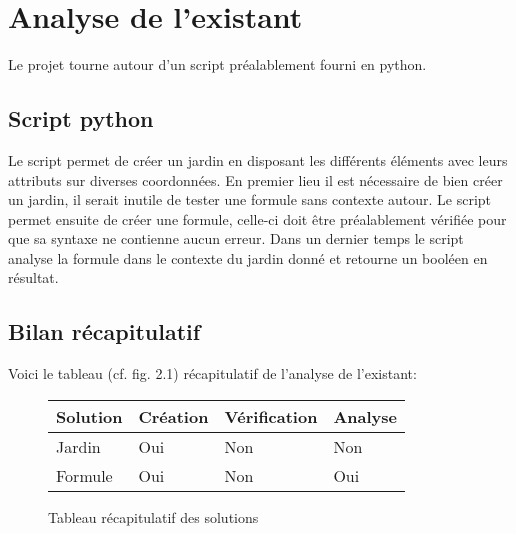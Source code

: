 \chapter{Analyse de l'existant}

Le projet tourne autour d'un script préalablement fourni en python.

\section{Script python}

Le script permet de créer un jardin en disposant les différents éléments avec leurs attributs sur diverses coordonnées.
En premier lieu il est nécessaire de bien créer un jardin, il serait inutile de tester une formule sans contexte autour.
Le script permet ensuite de créer une formule, celle-ci doit être préalablement vérifiée pour que sa syntaxe ne contienne aucun erreur.
Dans un dernier temps le script analyse la formule dans le contexte du jardin donné et retourne un booléen en résultat.


\section{Bilan récapitulatif}

Voici le tableau (cf. fig. 2.1) récapitulatif de l'analyse de l'existant:\\

\begin{figure}[!h]
\begin{center}
\begin{tabular}{|l|l|l|l|}
  \hline
  Solution & Création & Vérification & Analyse\\
  \hline
  Jardin & Oui & Non & Non \\
  Formule & Oui & Non & Oui \\
  \hline
\end{tabular}
\end{center}
\caption{Tableau récapitulatif des solutions}
\end{figure}
